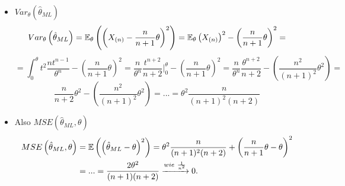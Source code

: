 \documentclass{tstextbook}
\begin{document}
\begin{example}
\begin{itemize}
	\item $Var_\theta (\hat{\theta}_{ML})$
	 \[ Var_\theta \left(\hat{\theta}_{ML} \right) = \mathbb E_\theta \left( \left( X_{(n)}-\frac{n}{n+1} \theta \right)^2 \right) = 
	  \mathbb E_\theta \left( X_{(n)} \right)^2 - \left( \frac{n}{n+1} \theta \right)^2 = \]
	 \[ = \int_{0}^{\theta} t^2 \frac{nt^{n-1}}{\theta^n} - \left( \frac{n}{n+1} \theta \right)^2 = \frac{n}{\theta^n} \frac{t^{n+2}}{n+2} \Big|_0^{\theta}  - \left( \frac{n}{n+1} \theta \right)^2 = \frac{n}{\theta^n} \frac{\theta^{n+2}}{n+2} -  \left( \frac{n^2}{(n+1)^2} \theta^2 \right) =\]
	   \[ \frac{n}{n+2}\theta^2 - \left( \frac{n^2}{(n+1)^2} \theta^2 \right) = ... = \theta^2 \frac{n}{(n+1)^2 (n+2)} \]
	   
	 \item Also $MSE\left(\hat{\theta}_{ML}, \theta \right) $
	 \[
	\begin{aligned}
		MSE\left(\hat{\theta}_{ML}, \theta \right) & = \mathbb E\left(\left(\hat{\theta}_{ML} - \theta\right)^2\right)
		=\theta^2 \frac{n}{(n+1)^2 (n+2)} + \left(  \frac{n}{n+1} \theta -\theta \right)^2 \\
			& = ... = \frac{2\theta^2}{(n+1)(n+2)} \xrightarrow{wie \ \frac{1}{n^2}} 0.
	\end{aligned}
	\]
	
	\end{itemize}
		
\end{example}
\end{document}
